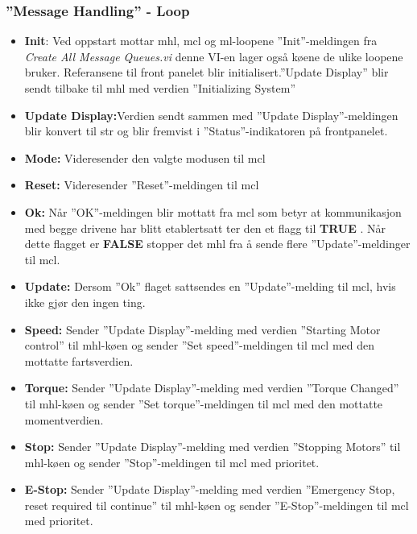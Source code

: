 \documentclass{ol-softwaremanual}
\newcommand{\true}{\textbf{TRUE} }
\newcommand{\false}{\textbf{FALSE} }
\begin{document}
\subsubsection*{''Message Handling'' - Loop}

\begin{itemize}
    \item \textbf{Init}: Ved oppstart mottar \acrfull{mhl}, \acrfull{mcl} og \acrfull{ml}-loopene ''Init''-meldingen fra \textit{Create All Message Queues.vi} denne VI-en lager også køene de ulike loopene bruker. Referansene til front panelet blir initialisert.''Update Display'' blir sendt tilbake til \acrshort{mhl} med verdien ''Initializing System''
    \item \textbf{Update Display:}Verdien sendt sammen med ''Update Display''-meldingen blir konvert til \gls{str} og blir fremvist i ''Status''-indikatoren på frontpanelet.
    \item \textbf{Mode:} Videresender den valgte modusen til \acrlong{mcl}
    \item \textbf{Reset:} Videresender ''Reset''-meldingen til \acrshort{mcl}
    \item \textbf{Ok:} Når ''OK''-meldingen blir mottatt fra \acrshort{mcl} som betyr at kommunikasjon med begge drivene har blitt etablertsatt ter den et  flagg til \true. Når dette flagget er \false stopper det \acrshort{mhl} fra å sende flere ''Update''-meldinger til \acrshort{mcl}. 
    \item \textbf{Update:} Dersom ''Ok'' flaget sattsendes en ''Update''-melding til \acrshort{mcl}, hvis ikke gjør den ingen ting.
    \item \textbf{Speed:} Sender ''Update Display''-melding med verdien ''Starting Motor control'' til \acrshort{mhl}-køen og sender ''Set speed''-meldingen til \acrshort{mcl} med den mottatte fartsverdien. 
    \item \textbf{Torque:} Sender ''Update Display''-melding med verdien ''Torque Changed'' til \acrshort{mhl}-køen og sender ''Set torque''-meldingen til \acrshort{mcl} med den mottatte momentverdien. 
    \item \textbf{Stop:} Sender ''Update Display''-melding med verdien ''Stopping Motors'' til \acrshort{mhl}-køen og sender ''Stop''-meldingen til \acrshort{mcl} med prioritet. 
    \item \textbf{E-Stop:} Sender ''Update Display''-melding med verdien ''Emergency Stop, reset required til continue'' til \acrshort{mhl}-køen og sender ''E-Stop''-meldingen til \acrshort{mcl} med prioritet. 

\end{itemize}
\end{document}
